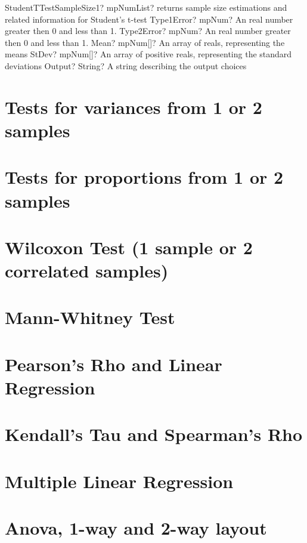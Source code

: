 \documentclass[12pt,a4paper,openany]{book}
\begin{document}
\begin{mpFunctionsExtract}
\mpFunctionFiveNotImplemented
{StudentTTestSampleSize1? mpNumList? returns sample size estimations and related information for Student's t-test}
{Type1Error? mpNum? An real number greater then 0 and less than 1.}
{Type2Error? mpNum? An real number greater then 0 and less than 1.}
{Mean? mpNum[]? An array of reals, representing the means}
{StDev? mpNum[]? An array of positive reals, representing the standard deviations}
{Output? String? A string describing the output choices}
\end{mpFunctionsExtract}

\section{Tests for variances from 1 or 2 samples}

\section{Tests for proportions from 1 or 2 samples}

\section{Wilcoxon Test (1 sample or 2 correlated samples)}

\section{Mann-Whitney Test}

\section{Pearson's Rho and Linear Regression}

\section{Kendall's Tau and Spearman's Rho}

\section{Multiple Linear Regression}

\section{Anova, 1-way and 2-way layout}
\end{document}
